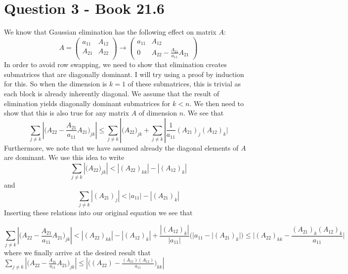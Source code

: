 \documentclass[a4paper,12pt]{article}
\begin{document}
\section{Question 3 - Book 21.6}
We know that Gaussian elimination has the following effect on matrix $A$:
\begin{equation}
A=\begin{pmatrix}
a_{11} & A_{12}\\
A_{21} & A_{22}\\
\end{pmatrix} \rightarrow
\begin{pmatrix}
a_{11}& A_{12}\\
0& A_{22}-\frac{A_{21}}{a_{11}}A_{21}
\end{pmatrix}
\end{equation} In order to avoid row swapping, we need to show that elimination creates submatrices that are diagonally dominant. I will try using a proof by induction for this. So when the dimension is $k=1$ of these submatrices, this is trivial as each block is already inherently diagonal. We assume that the result of elimination yields diagonally dominant submatrices for $k<n$. We then need to show that this is also true for any matrix $A$ of dimension $n$. We see that
\begin{equation}
\sum_{j\neq k}| \big(A_{22} -\frac{A_{21}}{a_{11}}A_{21}\big)_{jk} | \leq \sum_{j\neq k}| \big(A_{22}  \big)_{jk} + \sum_{j\neq k} |\frac{1}{a_{11}} (A_{21})_j (A_{12})_k|
\end{equation} Furthermore, we note that we have assumed already the diagonal elements of $A$ are dominant. We use this idea to write
\begin{equation}
\sum_{j\neq k}| \big(A_{22}\big)_{jk}| < |(A_{22})_{kk}| - |(A_{12})_k|
\end{equation} and 
\begin{equation}
\sum_{j\neq k} |(A_{21})_j | < |a_{11}| -|(A_{21})_k| 
\end{equation} Inserting these relations into our original equation we see that

\begin{equation}
\sum_{j\neq k}| \big(A_{22} -\frac{A_{21}}{a_{11}}A_{21}\big)_{jk} |  <  |(A_{22})_{kk}| - |(A_{12})_k| + \frac{|(A_{12})_k |}{|a_{11}|}\Bigg( |a_{11} - |(A_{21})_k| \Bigg) \leq |(A_{22})_{kk} -\frac{(A_{21})_k (A_{12})_k}{a_{11}}|
\end{equation} where we finally arrive at the desired result that $\sum_{j\neq k}| \big(A_{22} -\frac{A_{21}}{a_{11}}A_{21}\big)_{jk} | \leq  |\Bigg( (A_{22}) -\frac{(A_{21}) (A_{12})}{a_{11}}\Bigg)_{kk}|
$
\end{document}

